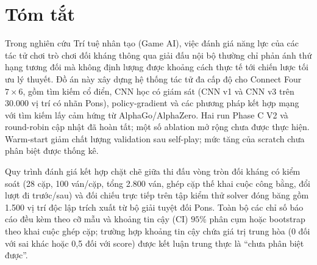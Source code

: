 \documentclass[11pt, a4paper]{article}
\begin{document}
\section*{Tóm tắt}

Trong nghiên cứu Trí tuệ nhân tạo (Game AI), việc đánh giá năng lực của các tác tử chơi trò chơi đối kháng thông qua giải đấu nội bộ thường chỉ phản ánh thứ hạng tương đối mà không định lượng được khoảng cách thực tế tới chiến lược tối ưu lý thuyết. Đồ án này xây dựng hệ thống tác tử đa cấp độ cho Connect Four $7 \times 6$, gồm tìm kiếm cổ điển, CNN học có giám sát (CNN v1 và CNN v3 trên 30.000 vị trí có nhãn Pons), policy-gradient và các phương pháp kết hợp mạng với tìm kiếm lấy cảm hứng từ AlphaGo/AlphaZero. Hai run Phase C V2 và round-robin cập nhật đã hoàn tất; một số ablation mở rộng chưa được thực hiện. Warm-start giảm chất lượng validation sau self-play; mức tăng của scratch chưa phân biệt được thống kê.

Quy trình đánh giá kết hợp chặt chẽ giữa thi đấu vòng tròn đối kháng có kiểm soát (28 cặp, 100 ván/cặp, tổng 2.800 ván, ghép cặp thế khai cuộc công bằng, đổi lượt đi trước/sau) và đối chiếu trực tiếp trên tập kiểm thử solver đóng băng gồm 1.500 vị trí độc lập trích xuất từ bộ giải tuyệt đối Pons. Toàn bộ các chỉ số báo cáo đều kèm theo cỡ mẫu và khoảng tin cậy (CI) $95\%$ phân cụm hoặc bootstrap theo khai cuộc ghép cặp; trường hợp khoảng tin cậy chứa giá trị trung hòa (0 đối với sai khác hoặc 0,5 đối với score) được kết luận trung thực là ``chưa phân biệt được''.
\end{document}
